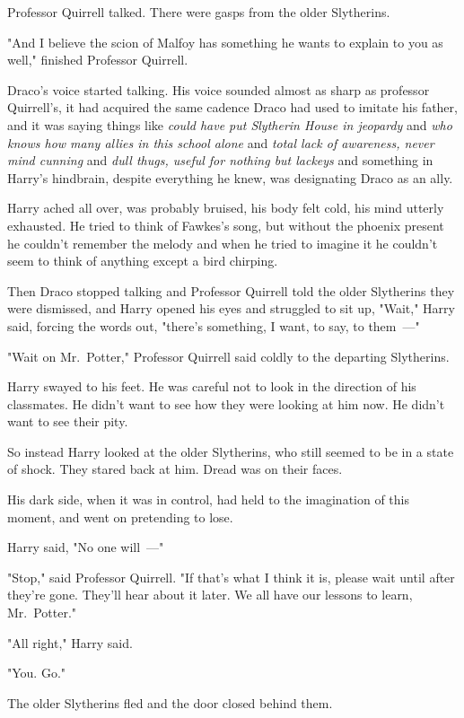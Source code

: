 Professor Quirrell talked. There were gasps from the older Slytherins.

"And I believe the scion of Malfoy has something he wants to explain to you as
well," finished Professor Quirrell.

Draco's voice started talking. His voice sounded almost as sharp as professor
Quirrell's, it had acquired the same cadence Draco had used to imitate his
father, and it was saying things like \emph{could have put Slytherin House in
jeopardy} and \emph{who knows how many allies in this school alone} and
\emph{total lack of awareness, never mind cunning} and \emph{dull thugs, useful
for nothing but lackeys} and something in Harry's hindbrain, despite everything
he knew, was designating Draco as an ally.

Harry ached all over, was probably bruised, his body felt cold, his mind
utterly exhausted. He tried to think of Fawkes's song, but without the phoenix
present he couldn't remember the melody and when he tried to imagine it he
couldn't seem to think of anything except a bird chirping.

Then Draco stopped talking and Professor Quirrell told the older Slytherins
they were dismissed, and Harry opened his eyes and struggled to sit up, "Wait,"
Harry said, forcing the words out, "there's something, I want, to say, to
them~---"

"Wait on Mr.~Potter," Professor Quirrell said coldly to the departing
Slytherins.

Harry swayed to his feet. He was careful not to look in the direction of his
classmates. He didn't want to see how they were looking at him now. He didn't
want to see their pity.

So instead Harry looked at the older Slytherins, who still seemed to be in a
state of shock. They stared back at him. Dread was on their faces.

His dark side, when it was in control, had held to the imagination of this
moment, and went on pretending to lose.

Harry said, "No one will~---"

"Stop," said Professor Quirrell. "If that's what I think it is, please wait
until after they're gone. They'll hear about it later. We all have our lessons
to learn, Mr.~Potter."

"All right," Harry said.

"You. Go."

The older Slytherins fled and the door closed behind them.

